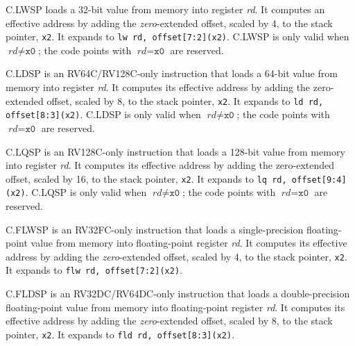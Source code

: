 C.LWSP loads a 32-bit value from memory into register {\em rd}.  It computes
an effective address by adding the {\em zero}-extended offset, scaled by 4, to
the stack pointer, {\tt x2}.  It expands to {\tt lw rd, offset[7:2](x2)}.
C.LWSP is only valid when $\textit{rd}{\neq}\texttt{x0}$;
the code points with $\textit{rd}{=}\texttt{x0}$ are reserved.


C.LDSP is an RV64C/RV128C-only instruction that loads a 64-bit value from memory into
register {\em rd}.  It computes its effective address by adding the
zero-extended offset, scaled by 8, to the stack pointer, {\tt x2}.
It expands to {\tt ld rd, offset[8:3](x2)}.
C.LDSP is only valid when $\textit{rd}{\neq}\texttt{x0}$;
the code points with $\textit{rd}{=}\texttt{x0}$ are reserved.

C.LQSP is an RV128C-only instruction that loads a 128-bit value from memory
into register {\em rd}.  It computes its effective address by adding the
zero-extended offset, scaled by 16, to the stack pointer, {\tt x2}.
It expands to {\tt lq rd, offset[9:4](x2)}.
C.LQSP is only valid when $\textit{rd}{\neq}\texttt{x0}$;
the code points with $\textit{rd}{=}\texttt{x0}$ are reserved.

C.FLWSP is an RV32FC-only instruction that loads a single-precision
floating-point value from memory into floating-point register {\em rd}. It
computes its effective address by adding the {\em zero}-extended offset,
scaled by 4, to the stack pointer, {\tt x2}.  It expands to {\tt flw rd,
offset[7:2](x2)}.

C.FLDSP is an RV32DC/RV64DC-only instruction that loads a double-precision
floating-point value from memory into floating-point register {\em rd}. It
computes its effective address by adding the {\em zero}-extended offset,
scaled by 8, to the stack pointer, {\tt x2}.  It expands to {\tt fld rd,
offset[8:3](x2)}.

